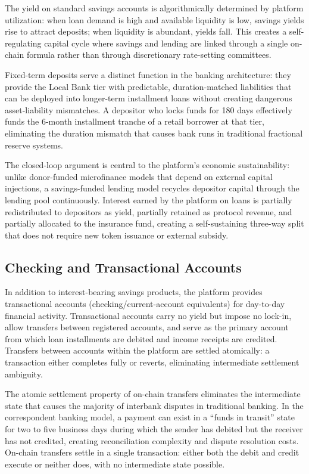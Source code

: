 \documentclass[12pt,a4paper]{report}
\begin{document}
The yield on standard savings accounts is algorithmically determined by platform utilization: when loan demand is high and available liquidity is low, savings yields rise to attract deposits; when liquidity is abundant, yields fall. This creates a self-regulating capital cycle where savings and lending are linked through a single on-chain formula rather than through discretionary rate-setting committees.

Fixed-term deposits serve a distinct function in the banking architecture: they provide the Local Bank tier with predictable, duration-matched liabilities that can be deployed into longer-term installment loans without creating dangerous asset-liability mismatches. A depositor who locks funds for 180 days effectively funds the 6-month installment tranche of a retail borrower at that tier, eliminating the duration mismatch that causes bank runs in traditional fractional reserve systems.

The closed-loop argument is central to the platform's economic sustainability: unlike donor-funded microfinance models that depend on external capital injections, a savings-funded lending model recycles depositor capital through the lending pool continuously. Interest earned by the platform on loans is partially redistributed to depositors as yield, partially retained as protocol revenue, and partially allocated to the insurance fund, creating a self-sustaining three-way split that does not require new token issuance or external subsidy.

\subsection{Checking and Transactional Accounts}

In addition to interest-bearing savings products, the platform provides transactional accounts (checking/current-account equivalents) for day-to-day financial activity. Transactional accounts carry no yield but impose no lock-in, allow transfers between registered accounts, and serve as the primary account from which loan installments are debited and income receipts are credited. Transfers between accounts within the platform are settled atomically: a transaction either completes fully or reverts, eliminating intermediate settlement ambiguity.

The atomic settlement property of on-chain transfers eliminates the intermediate state that causes the majority of interbank disputes in traditional banking. In the correspondent banking model, a payment can exist in a ``funds in transit'' state for two to five business days during which the sender has debited but the receiver has not credited, creating reconciliation complexity and dispute resolution costs. On-chain transfers settle in a single transaction: either both the debit and credit execute or neither does, with no intermediate state possible.
\end{document}
